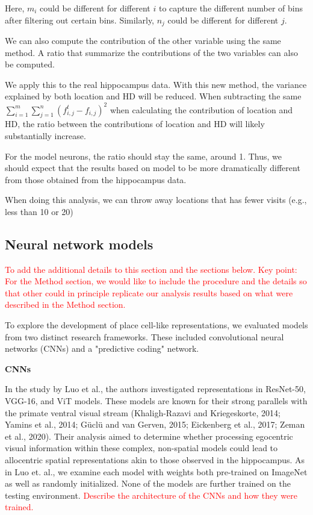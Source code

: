\documentclass[11pt]{article}
\begin{document}
Here, $m_i$ could be different for different $i$ to capture the different number of bins after filtering out certain bins. Similarly, $n_j$ could be different for different $j$.


We can also compute the contribution of the other variable using the same method. A ratio that summarize the contributions of the two variables can also be computed. 

We apply this to the real hippocampus data. With this new method, the variance explained by both location and HD will be reduced. When subtracting the same $\sum_{i=1}^m\sum_{j=1}^n (f^t_{i,j} -f_{i,j})^2$ when calculating the contribution of location and HD, the ratio between the contributions of location and HD will likely substantially increase. 

For the model neurons, the ratio should stay the same, around 1. Thus, we should expect that the results based on model to be more dramatically different from those obtained from the hippocampus data. 

When doing this analysis, we can throw away locations that has fewer visits (e.g., less than 10 or 20)


\subsection{Neural network models}
\textcolor{red}{To add the additional details to this section and the sections below. Key point: For the Method section, we would like to include the procedure and the details so that other could in principle replicate our analysis results based on what were described in the Method section.}

To explore the development of place cell-like representations, we evaluated models from two distinct research frameworks. These included convolutional neural networks (CNNs) and a "predictive coding" network.

{\bf CNNs}

In the study by Luo et al., the authors investigated representations in ResNet-50, VGG-16, and ViT models. These models are known for their strong parallels with the primate ventral visual stream (Khaligh-Razavi and Kriegeskorte, 2014; Yamins et al., 2014; Güclü and van Gerven, 2015; Eickenberg et al., 2017; Zeman et al., 2020). Their analysis aimed to determine whether processing egocentric visual information within these complex, non-spatial models could lead to allocentric spatial representations akin to those observed in the hippocampus. As in Luo et. al., we examine each model with weights both pre-trained on ImageNet as well as randomly initialized. None of the models are further trained on the testing environment. \textcolor{red}{Describe the architecture of the CNNs and how they were trained.}
\end{document}

